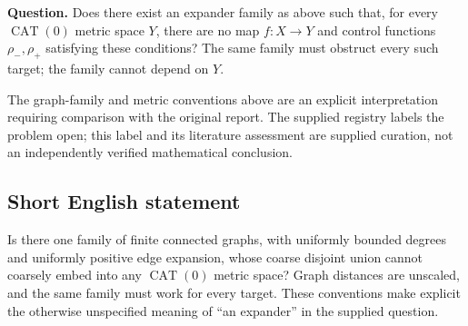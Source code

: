 \documentclass[11pt]{article}
\begin{document}
\textbf{Question.} Does there exist an expander family as above such that, for every \(\operatorname{CAT}(0)\) metric space \(Y\), there are no map \(f:X\to Y\) and control functions \(\rho_-,\rho_+\) satisfying these conditions? The same family must obstruct every such target; the family cannot depend on \(Y\).

The graph-family and metric conventions above are an explicit interpretation requiring comparison with the original report. The supplied registry labels the problem open; this label and its literature assessment are supplied curation, not an independently verified mathematical conclusion.
\subsection{Short English statement}
Is there one family of finite connected graphs, with uniformly bounded degrees and uniformly positive edge expansion, whose coarse disjoint union cannot coarsely embed into any \(\operatorname{CAT}(0)\) metric space? Graph distances are unscaled, and the same family must work for every target. These conventions make explicit the otherwise unspecified meaning of ``an expander'' in the supplied question.
\end{document}
